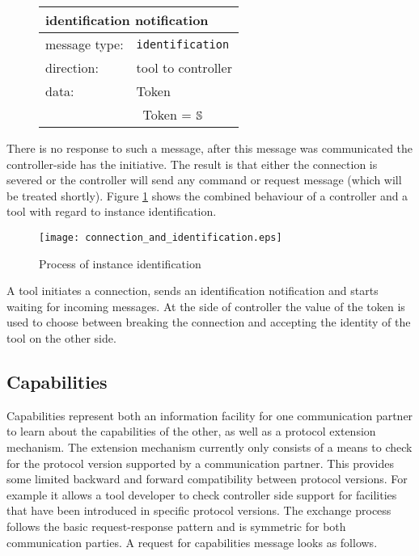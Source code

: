 \documentclass{article}
\newcommand{\msg}[1]{\texttt{#1}}
\newcommand{\String}{\ensuremath \mathbb{S}\xspace}
\begin{document}
   \begin{figure}[H]
    \begin{center}
     \vspace{-0.3cm}
     \begin{tabular}{|ll|}
      \hline
       \multicolumn{2}{|l|}{\textbf{identification notification}} \\
      \hline
       message type:    & \msg{identification} \\
      \hline
       direction:       & tool to controller \\
       data:            & Token \\
                        & \ Token = $\String$ \\
      \hline
     \end{tabular}
     \vspace{-0.5cm}
    \end{center}
   \end{figure}

   \noindent There is no response to such a message, after this message was
   communicated the controller-side has the initiative. The result is that
   either the connection is severed or the controller will send any command or
   request message (which will be treated shortly). Figure
   \ref{fig::identification} shows the combined behaviour of a controller and a
   tool with regard to instance identification.

   \begin{figure}[H]
    \begin{center}
     \texttt{[image: connection\_and\_identification.eps]}
    \end{center}
    \vspace{-0.5cm}
    \caption{Process of instance identification}
    \vspace{-0.2cm}
    \label{fig::identification}
   \end{figure}
\enlargethispage{1cm}
   \noindent A tool initiates a connection, sends an identification
   notification and starts waiting for incoming messages.  At the side of
   controller the value of the token is used to choose between breaking the
   connection and accepting the identity of the tool on the other side.
\pagebreak
  \subsection{Capabilities} \label{ss:capabilities}

   Capabilities represent both an information facility for one communication
   partner to learn about the capabilities of the other, as well as a protocol
   extension mechanism. The extension mechanism currently only consists of a
   means to check for the protocol version supported by a communication
   partner. This provides some limited backward and forward compatibility
   between protocol versions.  For example it allows a tool developer to check
   controller side support for facilities that have been introduced in specific
   protocol versions. The exchange process follows the basic request-response
   pattern and is symmetric for both communication parties. A request for
   capabilities message looks as follows.
\end{document}
